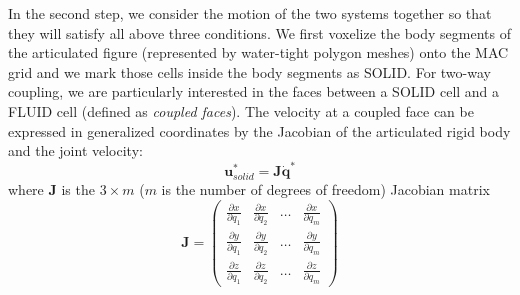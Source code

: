 In the second step, we consider the motion of the two systems together so
that they will satisfy all above three conditions. We first voxelize the
body segments of the articulated figure (represented by water-tight
polygon meshes) onto the MAC grid and we mark those cells inside the body
segments as SOLID. For two-way coupling, we are particularly interested in
the faces between a SOLID cell and a FLUID cell (defined as \emph{coupled
faces}). The velocity at a coupled face can be expressed in generalized
coordinates by the Jacobian of the articulated rigid body and the joint
velocity:
\begin{displaymath}
\mathbf{u}^*_{solid}=\mathbf{J}\mathbf{\dot{q}}^*
\end{displaymath}
where $\mathbf{J}$ is the $3\times m$ ($m$ is the number of degrees of freedom) Jacobian matrix
\begin{displaymath}
\mathbf{J}=
\left( \begin{array}{cccc}
\frac{\partial x}{\partial q_1} & \frac{\partial x}{\partial q_2} & \ldots & \frac{\partial x}{\partial q_m} \\
\frac{\partial y}{\partial q_1} & \frac{\partial y}{\partial q_2} & \ldots & \frac{\partial y}{\partial q_m} \\
\frac{\partial z}{\partial q_1} & \frac{\partial z}{\partial q_2} & \ldots & \frac{\partial z}{\partial q_m}
\end{array} \right)
\end{displaymath}

